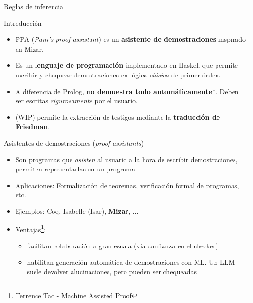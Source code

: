 \documentclass[xcolor={dvipsnames},spanish]{beamer}
\begin{document}
\begin{frame}{Reglas de inferencia}
    \begin{definitions}
        
    \end{definitions}
\end{frame}



\begin{frame}{Introducción}
    \begin{itemize}
        \item PPA (\textit{Pani's proof assistant}) es un \textbf{asistente de demostraciones} inspirado en Mizar.
        \item Es un \textbf{lenguaje de programación} implementado en Haskell que permite escribir y chequear demostraciones en lógica \textit{clásica} de primer órden.
        \item A diferencia de Prolog, \textbf{no demuestra todo automáticamente}*. Deben ser escritas \textit{rigurosamente} por el usuario.
        \item (WIP) permite la extracción de testigos mediante la \textbf{traducción de Friedman}.
    \end{itemize}
\end{frame}

\begin{frame}{Asistentes de demostraciones (\textit{proof assistants})}
    \begin{itemize}
        \item Son programas que \textit{asisten} al usuario a la hora de escribir demostraciones, permiten representarlas en un programa
        \item Aplicaciones: Formalización de teoremas, verificación formal de programas, etc.
        \item Ejemplos: Coq, Isabelle (Isar), \textbf{Mizar}, $\dots$
        \item Ventajas\footnote{\href{https://youtu.be/AayZuuDDKP0?si=eGETzgh9PQ_8JecR}{Terrence Tao - Machine Assisted Proof}}:
        \begin{itemize}
            \item facilitan colaboración a gran escala (via confianza en el checker)
            \item habilitan generación automática de demostraciones con ML. Un LLM suele devolver alucinaciones, pero pueden ser chequeadas
        \end{itemize}
        
    \end{itemize}
\end{frame}
\end{document}
